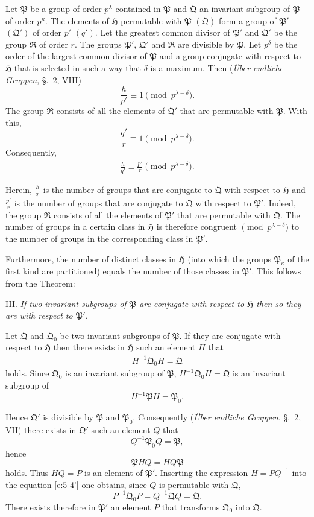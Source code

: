 \documentclass[a5paper,12pt]{article}
\let\fr\mathfrak
\newcommand{\CH}{\fr{H}}
\newcommand{\CP}{\fr{P}}
\newcommand{\CQ}{\fr{Q}}
\newcommand{\CR}{\fr{R}}
\newcommand{\?}{{\color{blue}${}^{(?)}$}}
\newcounter{origpagecounter}{}
\newcommand{\origpagebreak}{\mark{\arabic{origpagecounter}}\addtocounter{origpagecounter}{1}\mark{\arabic{origpagecounter}}}
\begin{document}
Let $\CP$ be a group of order $p^\lambda$ 
contained in $\CP$
and
$\CQ$ an invariant subgroup of $\CP$ of order $p^\kappa$.
%
%
The elements of $\CH$ permutable with $\CP$ $(\CQ)$
form a group of $\CP'$ $(\CQ')$
of order $p'$ $(q')$.
%
%
Let
the greatest common divisor
of $\CP'$ and $\CQ'$
be the group $\CR$ of order $r$.
%
%
The groups 
$\CP'$, $\CQ'$ and $\CR$
are divisible by $\CP$.
%
%
Let $p^\delta$
be the order of 
the largest common divisor 
of $\CP$
and 
a group conjugate
with respect to $\CH$
that is selected
in such a way
that $\delta$ is a maximum.
%
%
Then
(\emph{\"Uber endliche Gruppen}, \S.~2, VIII)
\[
	\frac{h}{p'}
	\equiv
	1
	\pmod{p^{\lambda-\delta}}
	.
\]
%
%
The group $\CR$
consists
of all the elements of $\CQ'$
that are permutable with $\CP$.
%
%
With this,
\[
	\frac{q'}{r} \equiv 1
	\pmod{p^{\lambda-\delta}}
	.
\]
%
%
Consequently,
\begin{align} \label{e:5-7} \tag{7.}
	\frac{h}{q'} \equiv \frac{p'}{r}
	\pmod{p^{\lambda-\delta}}
	.
\end{align}


Herein,
$\frac{h}{q'}$
is the number of groups
that are conjugate to $\CQ$
with respect to $\CH$
and
$\frac{p'}{r}$
is the number of groups
that are conjugate to $\CQ$
with respect to $\CP'$.
%
%
Indeed,
the group $\CR$
consists
of all the elements of $\CP'$
that are permutable with $\CQ$.
%
%
The number of groups
in a certain class in $\CH$
is therefore
congruent $\!\!\pmod{p^{\lambda-\delta}}$
to
the number of groups
in the corresponding class in $\CP'$.


Furthermore,
the number of distinct classes in $\CH$
(into which the groups $\CP_\kappa$ of the first kind
are partitioned)
equals
the number of those classes in $\CP'$.
%
%
This follows from the Theorem:


III.
%
\label{t:5-3}
%
\emph{ %
If two invariant subgroups of $\CP$
are conjugate with respect to $\CH$
then 
so they are with respect to $\CP'$.
}


Let $\CQ$ and $\CQ_0$
be two invariant subgroups of $\CP$.
%
%
If they are conjugate with respect to $\CH$
then
there exists in $\CH$
such an element $H$
that
\begin{align} \label{e:5-4'} \tag{4.}
	H^{-1} \CQ_0 H = \CQ
\end{align}
holds.
%
%
Since $\CQ_0$ is an invariant subgroup of $\CP$,
$H^{-1} \CQ_0 H = \CQ$
is an invariant subgroup of 
\[
	H^{-1} \CP H = \CP_0
	.
\]
%
%
\origpagebreak
%
%
Hence
$\CQ'$ is divisible by $\CP$ and $\CP_0$.
%
%
Consequently
(\emph{\"Uber endliche Gruppen}, \S.~2, VII)
there exists in $\CQ'$ 
such an element $Q$
that
\[
	Q^{-1} \CP_0 Q = \CP
	,
\]
hence
\[
	\CP H Q = H Q \CP
\]
holds.
%
%
Thus $H Q = P$
is an element of $\CP'$.
%
%
Inserting the expression $H = P Q^{-1}$
into the equation \eqref{e:5-4'}
one obtains,
since $Q$ is permutable with $\CQ$,
\[
	P^{-1} \CQ_0 P
	=
	Q^{-1} \CQ Q
	=
	\CQ
	.
\]
%
%
There exists therefore
in $\CP'$
an element $P$
that transforms $\CQ_0$ into $\CQ$.
\end{document}
